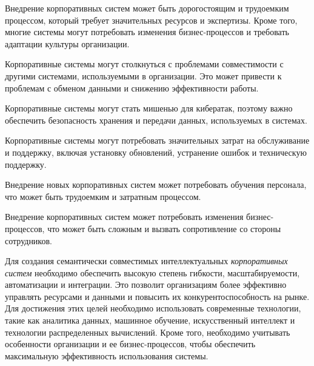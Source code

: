 \begin{textitemize}
    \item Внедрение корпоративных систем может быть дорогостоящим и трудоемким процессом, который требует значительных ресурсов и экспертизы. Кроме того, многие системы могут потребовать изменения бизнес-процессов и требовать адаптации культуры организации.
    \item Корпоративные системы могут столкнуться с проблемами совместимости с другими системами, используемыми в организации. Это может привести к проблемам с обменом данными и снижению эффективности работы.
    \item Корпоративные системы могут стать мишенью для кибератак, поэтому важно обеспечить безопасность хранения и передачи данных, используемых в системах.
    \item Корпоративные системы могут потребовать значительных затрат на обслуживание и поддержку, включая установку обновлений, устранение ошибок и техническую поддержку.
    \item Внедрение новых корпоративных систем может потребовать обучения персонала, что может быть трудоемким и затратным процессом.
    \item Внедрение корпоративных систем может потребовать изменения бизнес-процессов, что может быть сложным и вызвать сопротивление со стороны сотрудников.
\end{textitemize}

Для создания семантически совместимых интеллектуальных \textit{корпоративных систем} необходимо обеспечить высокую степень гибкости, масштабируемости, автоматизации и интеграции. Это позволит организациям более эффективно управлять ресурсами и данными и повысить их конкурентоспособность на рынке. Для достижения этих целей необходимо использовать современные технологии, такие как аналитика данных, машинное обучение, искусственный интеллект и технологии распределенных вычислений. Кроме того, необходимо учитывать особенности организации и ее бизнес-процессов, чтобы обеспечить максимальную эффективность использования системы. 

